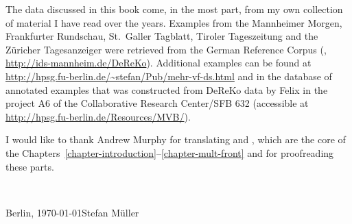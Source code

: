 The data discussed in this book come, in the most part, from my own collection of material I have
read over the years. Examples from the Mannheimer Morgen, Frankfurter Rundschau, St.\ Galler
Tagblatt, Tiroler Tageszeitung and the Züricher Tagesanzeiger were retrieved from the German Reference Corpus (\citealp{DeReKo}, \url{http://ids-mannheim.de/DeReKo}). Additional examples can be found at
\url{http://hpsg.fu-berlin.de/~stefan/Pub/mehr-vf-ds.html} and in the database of annotated  examples that was constructed from DeReKo data by Felix \citet{Bildhauer2011a} in the project A6 of the Collaborative Research Center/SFB 632 (accessible at \url{http://hpsg.fu-berlin.de/Resources/MVB/}).%

I would like to thank Andrew Murphy for translating  and ,
which are the core of the Chapters~\ref{chapter-introduction}--\ref{chapter-mult-front} and for
proofreading these parts.



~\medskip

\noindent
Berlin, \today\hfill Stefan Müller



\mainmatter










\appendix



%

\backmatter

%
\printbibliography[heading=references] 
\cleardoublepage

\small
   

\printindex 
  
\printindex[lan] 
  
\printindex[sbj]


 






